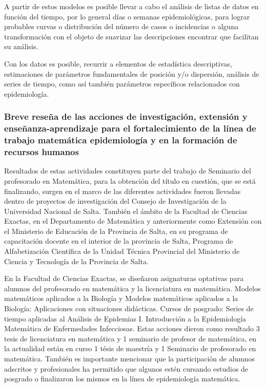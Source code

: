 A partir de estos modelos es posible llevar a cabo el análisis de listas de datos en función del tiempo, por lo general días o semanas epidemiológicas, para lograr probables curvas o distribución del número de casos o incidencias o alguna transformación con el objeto de suavizar las descripciones encontrar que facilitan su análisis.

Con los datos es posible, recurrir a elementos de estadística descriptivas, estimaciones de parámetros fundamentales de posición y/o dispersión, análisis de series de tiempo, como así también parámetros específicos relacionados con epidemiología.

\subsubsection{Breve reseña de las acciones de investigación, extensión y enseñanza-aprendizaje para el fortalecimiento de la línea de trabajo matemática epidemiología y en la formación de recursos humanos}

Resultados de estas actividades constituyen parte del trabajo de Seminario del profesorado en Matemática, para la obtención del título en cuestión, que se está finalizando, surgen en el marco de las diferentes actividades fueron llevadas dentro de proyectos de investigación del Consejo de Investigación de la Universidad Nacional de Salta. También el ámbito de la Facultad de Ciencias Exactas, en el Departamento de Matemática y anteriormente como Extensión con el Ministerio de Educación de la Provincia de Salta, en su programa de capacitación docente en el interior de la provincia de Salta, Programa de Alfabetización Científica de la Unidad Técnica Provincial del Ministerio de Ciencia y Tecnología de la Provincia de Salta.

En la Facultad de Ciencias Exactas, se diseñaron asignaturas optativas para alumnos del profesorado en matemática y la licenciatura en matemática. Modelos matemáticos aplicados a la Biología y Modelos matemáticos aplicados a la Biología: Aplicaciones con situaciones didácticas. Cursos de posgrado: Series de tiempo aplicadas al Análisis de Epidemias I. Introducción a la Epidemiología Matemática de Enfermedades Infecciosas. Estas acciones dieron como resultado 3 tesis de licenciatura en matemática y 1 seminario de profesor de matemática, en la actualidad están en curso 1 tésis de maestría y 1 Seminario de profesorado en matemática. También es importante mencionar que la participación de alumnos adscritos y profesionales ha permitido que algunos estén cursando estudios de posgrado o finalizaron los mismos en la línea de epidemiología matemática.

